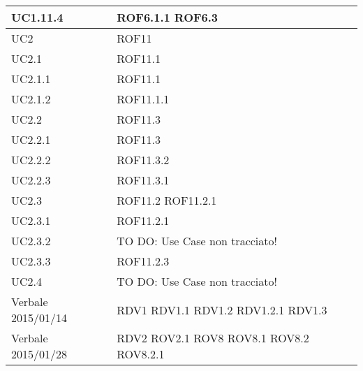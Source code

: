 \begin{center}
\begin{longtable}{| p{4cm} | p{4cm} |}
\hline
UC1.11.4 & ROF6.1.1 \newline ROF6.3 \\
\hline
UC2 & ROF11 \\
\hline
UC2.1 & ROF11.1 \\
\hline
UC2.1.1 & ROF11.1 \\
\hline
UC2.1.2 & ROF11.1.1 \\
\hline
UC2.2 & ROF11.3 \\
\hline
UC2.2.1 & ROF11.3 \\
\hline
UC2.2.2 & ROF11.3.2 \\
\hline
UC2.2.3 & ROF11.3.1 \\
\hline
UC2.3 & ROF11.2 \newline ROF11.2.1 \\
\hline
UC2.3.1 & ROF11.2.1 \\
\hline
UC2.3.2 & TO DO: Use Case non tracciato! \\
\hline
UC2.3.3 & ROF11.2.3 \\
\hline
UC2.4 & TO DO: Use Case non tracciato! \\
\hline
Verbale 2015/01/14 & RDV1 \newline RDV1.1 \newline RDV1.2 \newline RDV1.2.1 \newline RDV1.3 \\
\hline
Verbale 2015/01/28 & RDV2 \newline ROV2.1 \newline ROV8 \newline ROV8.1 \newline ROV8.2 \newline ROV8.2.1 \\
\hline
\end{longtable}
\egroup
\end{center}

